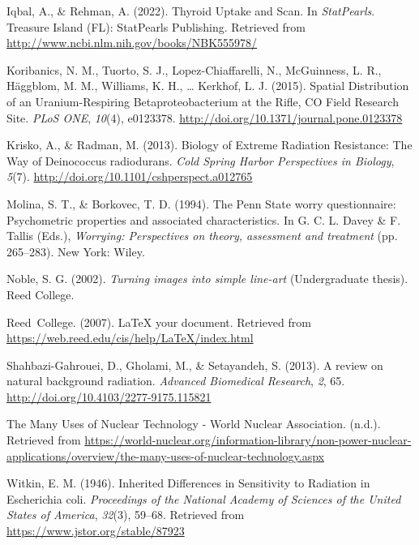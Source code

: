 \documentclass[12pt,twoside]{reedthesis}
\begin{document}
\leavevmode\hypertarget{ref-iqbal_thyroid_2022}{}%
Iqbal, A., \& Rehman, A. (2022). Thyroid Uptake and Scan. In \emph{StatPearls}. Treasure Island (FL): StatPearls Publishing. Retrieved from \url{http://www.ncbi.nlm.nih.gov/books/NBK555978/}

\leavevmode\hypertarget{ref-koribanics_spatial_2015}{}%
Koribanics, N. M., Tuorto, S. J., Lopez-Chiaffarelli, N., McGuinness, L. R., Häggblom, M. M., Williams, K. H., \ldots{} Kerkhof, L. J. (2015). Spatial Distribution of an Uranium-Respiring Betaproteobacterium at the Rifle, CO Field Research Site. \emph{PLoS ONE}, \emph{10}(4), e0123378. \url{http://doi.org/10.1371/journal.pone.0123378}

\leavevmode\hypertarget{ref-krisko_biology_2013}{}%
Krisko, A., \& Radman, M. (2013). Biology of Extreme Radiation Resistance: The Way of Deinococcus radiodurans. \emph{Cold Spring Harbor Perspectives in Biology}, \emph{5}(7). \url{http://doi.org/10.1101/cshperspect.a012765}

\leavevmode\hypertarget{ref-Molina1994}{}%
Molina, S. T., \& Borkovec, T. D. (1994). The Penn State worry questionnaire: Psychometric properties and associated characteristics. In G. C. L. Davey \& F. Tallis (Eds.), \emph{Worrying: Perspectives on theory, assessment and treatment} (pp. 265--283). New York: Wiley.

\leavevmode\hypertarget{ref-noble2002}{}%
Noble, S. G. (2002). \emph{Turning images into simple line-art} (Undergraduate thesis). Reed College.

\leavevmode\hypertarget{ref-reedweb2007}{}%
Reed~College. (2007). LaTeX your document. Retrieved from \url{https://web.reed.edu/cis/help/LaTeX/index.html}

\leavevmode\hypertarget{ref-shahbazi-gahrouei_review_2013}{}%
Shahbazi-Gahrouei, D., Gholami, M., \& Setayandeh, S. (2013). A review on natural background radiation. \emph{Advanced Biomedical Research}, \emph{2}, 65. \url{http://doi.org/10.4103/2277-9175.115821}

\leavevmode\hypertarget{ref-noauthor_many_nodate}{}%
The Many Uses of Nuclear Technology - World Nuclear Association. (n.d.). Retrieved from \url{https://world-nuclear.org/information-library/non-power-nuclear-applications/overview/the-many-uses-of-nuclear-technology.aspx}

\leavevmode\hypertarget{ref-witkin_inherited_1946}{}%
Witkin, E. M. (1946). Inherited Differences in Sensitivity to Radiation in Escherichia coli. \emph{Proceedings of the National Academy of Sciences of the United States of America}, \emph{32}(3), 59--68. Retrieved from \url{https://www.jstor.org/stable/87923}
\end{document}
